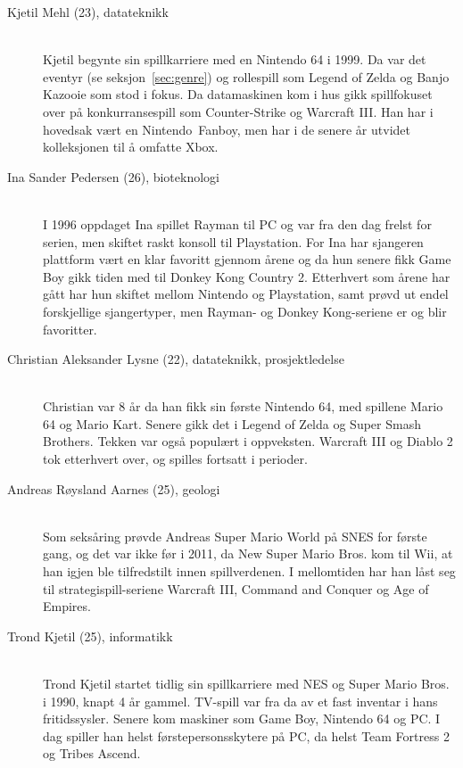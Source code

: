 \begin{description}
\item[Kjetil Mehl (23), datateknikk] \hfill \\
Kjetil begynte sin spillkarriere med en \gls{Nintendo 64} i 1999. Da
var det eventyr (se seksjon~\ref{sec:genre}) og rollespill som
\gls{Legend of Zelda} og \gls{Banjo Kazooie} som
stod i fokus. Da datamaskinen kom i hus gikk spillfokuset  over på
konkurransespill som \gls{Counter-Strike} og \gls{Warcraft III}. Han har i hovedsak vært
en Nintendo~\gls{Fanboy}, men har i de senere år utvidet
kolleksjonen til å omfatte Xbox.

\item[Ina Sander Pedersen (26), bioteknologi] \hfill \\
I 1996 oppdaget Ina spillet \gls{Rayman} til PC og var fra den dag frelst for
serien, men skiftet raskt konsoll til Playstation. For Ina har sjangeren
plattform vært en klar favoritt gjennom årene og da hun senere fikk
\gls{Game Boy} gikk tiden med til \gls{Donkey Kong Country 2}. Etterhvert som årene har gått har hun skiftet mellom
Nintendo og Playstation, samt prøvd ut endel forskjellige sjangertyper,
men Rayman- og Donkey Kong-seriene er og blir favoritter. 

\item[Christian Aleksander Lysne (22), datateknikk, prosjektledelse] \hfill \\
Christian var 8 år da han fikk sin første \gls{Nintendo 64}, med
spillene \gls{Mario 64} og \gls{Mario Kart}.
Senere gikk det i \gls{Legend of Zelda}  og \gls{Super Smash Brothers}.
\gls{Tekken} var også  populært i oppveksten. \gls{Warcraft III} og
\gls{Diablo 2} tok etterhvert over, og spilles fortsatt i perioder.

\item[Andreas Røysland Aarnes (25), geologi] \hfill \\
Som seksåring prøvde Andreas \gls{Super Mario World} på
\gls{SNES} for første gang, og det var ikke før
i 2011, da New Super Mario Bros. kom til
\gls{Wii}, at han igjen ble tilfredstilt innen
spillverdenen. I mellomtiden har han låst seg til strategispill-seriene
\gls{Warcraft III}, \gls{Command and Conquer} og Age of
Empires. 

\item[Trond Kjetil (25), informatikk] \hfill \\
Trond Kjetil startet tidlig sin spillkarriere med \gls{NES} og Super Mario Bros. i 1990, knapt 4 år gammel. TV-spill var fra da av et fast inventar i hans fritidssysler. Senere kom maskiner som \gls{Game Boy}, \gls{Nintendo 64} og PC. I dag spiller han helst førstepersonsskytere på PC, da helst \gls{Team Fortress 2} og \gls{Tribes Ascend}.
\end{description}

